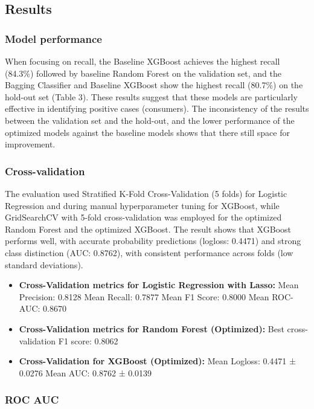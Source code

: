 \documentclass{article}
\begin{document}
\subsection*{Results}

\subsubsection*{Model performance}

When focusing on recall, the Baseline XGBoost achieves the highest recall (84.3\%) followed by baseline Random Forest on the validation set, and the Bagging Classifier and Baseline XGBoost show the highest recall (80.7\%) on the hold-out set (Table 3). These results suggest that these models are particularly effective in identifying positive cases (consumers). The inconsistency of the results between the validation set and the hold-out, and the lower performance of the optimized models against the baseline models shows that there still space for improvement.

\subsubsection*{Cross-validation}

The evaluation used Stratified K-Fold Cross-Validation (5 folds) for Logistic Regression and during manual hyperparameter tuning for XGBoost, while GridSearchCV with 5-fold cross-validation was employed for the optimized Random Forest and the optimized XGBoost. The result shows that XGBoost performs well, with accurate probability predictions (logloss: 0.4471) and strong class distinction (AUC: 0.8762), with consistent performance across folds (low standard deviations).

\begin{itemize}
    \item \textbf{Cross-Validation metrics for Logistic Regression with Lasso:}
Mean Precision: 0.8128
Mean Recall: 0.7877
Mean F1 Score: 0.8000
Mean ROC-AUC: 0.8670

\item \textbf{Cross-Validation metrics for Random Forest (Optimized):}
Best cross-validation F1 score: 0.8062

\item \textbf{Cross-Validation for XGBoost (Optimized):}
Mean Logloss: 0.4471 ± 0.0276
Mean AUC: 0.8762 ± 0.0139
\end{itemize}


\subsubsection*{ROC AUC}
\end{document}
